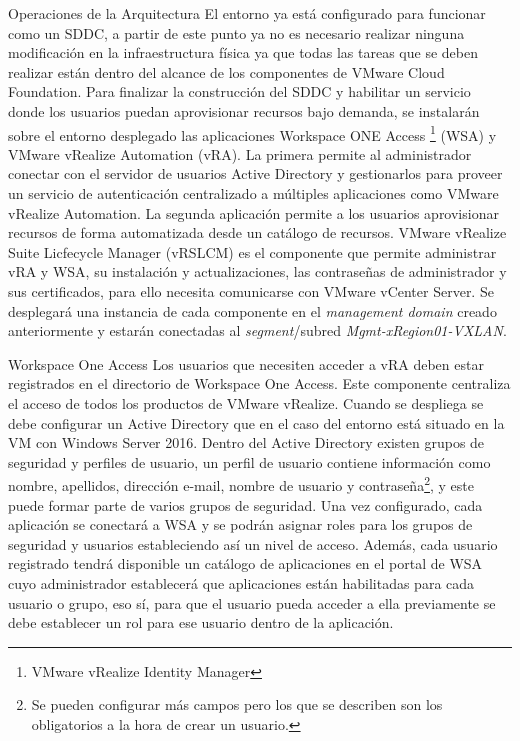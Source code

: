\begin{subsection}{Operaciones de la Arquitectura}
    El entorno ya está configurado para funcionar como un SDDC, a partir de este punto ya no es necesario realizar ninguna modificación en la infraestructura física ya que todas las tareas que se deben realizar están dentro del alcance de los componentes de VMware Cloud Foundation. Para finalizar la construcción del SDDC y habilitar un servicio donde los usuarios puedan aprovisionar recursos bajo demanda, se instalarán sobre el entorno desplegado las aplicaciones Workspace ONE Access \footnote{VMware vRealize Identity Manager} (WSA) y VMware vRealize Automation (vRA). La primera permite al administrador conectar con el servidor de usuarios Active Directory y gestionarlos para proveer un servicio de autenticación centralizado a múltiples aplicaciones como VMware vRealize Automation. La segunda aplicación permite a los usuarios aprovisionar recursos de forma automatizada desde un catálogo de recursos. VMware vRealize Suite Licfecycle Manager (vRSLCM) es el componente que permite administrar vRA y WSA, su instalación y actualizaciones, las contraseñas de administrador y sus certificados, para ello necesita comunicarse con VMware vCenter Server. Se desplegará una instancia de cada componente en el \textit{management domain} creado anteriormente y estarán conectadas al \textit{segment}/subred \textit{Mgmt-xRegion01-VXLAN}.
    
        
    \begin{subsubsection}{Workspace One Access}
        Los usuarios que necesiten acceder a vRA deben estar registrados en el directorio de Workspace One Access. Este componente centraliza el acceso de todos los productos de VMware vRealize. Cuando se despliega se debe configurar un Active Directory que en el caso del entorno está situado en la VM con Windows Server 2016. Dentro del Active Directory existen grupos de seguridad y perfiles de usuario, un perfil de usuario contiene información como nombre, apellidos, dirección e-mail, nombre de usuario y contraseña\footnote{Se pueden configurar más campos pero los que se describen son los obligatorios a la hora de crear un usuario.}, y este puede formar parte de varios grupos de seguridad. Una vez configurado, cada aplicación se conectará a WSA y se podrán asignar roles para los grupos de seguridad y usuarios estableciendo así un nivel de acceso. Además, cada usuario registrado tendrá disponible un catálogo de aplicaciones en el portal de WSA cuyo administrador establecerá que aplicaciones están habilitadas para cada usuario o grupo, eso sí, para que el usuario pueda acceder a ella previamente se debe establecer un rol para ese usuario dentro de la aplicación.


\end{subsubsection}
\end{subsection}
